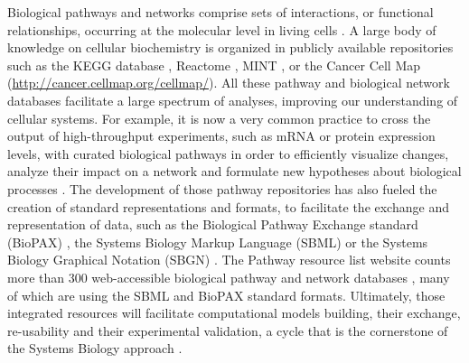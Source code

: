\documentclass[10pt]{bmc_article}
\newenvironment{bmcformat}{\baselineskip20pt\sloppy\setboolean{publ}{false}}{\baselineskip20pt\sloppy}
\begin{document}
\begin{bmcformat}
Biological pathways and networks comprise sets of interactions, or functional
relationships, occurring at the molecular level in living cells
\cite{adriaens2008public, cary2005pathway}. 
A large body of knowledge on cellular biochemistry is organized in publicly available
repositories such as the KEGG database \cite{ogata1999kegg}, Reactome
\cite{joshi2005reactome}, MINT \cite{zanzoni2002mint}, or the Cancer Cell Map
(\url{http://cancer.cellmap.org/cellmap/}). All these pathway and biological
network databases facilitate a large spectrum of analyses, improving our
understanding of cellular systems. For example, it is now a very common
practice to cross the output of high-throughput experiments, such as mRNA or
protein expression levels, with curated biological pathways in
order to efficiently visualize changes, analyze their impact on a network and
formulate new hypotheses about
biological processes \cite{saraiya2005visualizing,
gehlenborg2010visualization}. The development of those pathway repositories has
also fueled the creation of standard representations and formats, to facilitate
the exchange and representation of data, such as the Biological Pathway
Exchange standard (BioPAX) \cite{demir2010biopax}, the Systems Biology Markup
Language (SBML) \cite{hucka2003systems} or the Systems Biology Graphical
Notation (SBGN) \cite{le2009systems}. The Pathway resource list website counts
more than 300 web-accessible biological pathway and network databases
\cite{bader2006pathguide}, many of which are using the SBML and BioPAX standard
formats. Ultimately, those integrated resources will facilitate computational
models building, their exchange, re-usability and their experimental validation, a cycle that is the
cornerstone of the Systems Biology approach \cite{karlebach2008modelling,
kitano2002systems, ideker2001new}.


\end{bmcformat}
\end{document}
